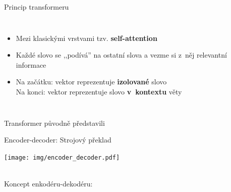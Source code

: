 \documentclass[aspectratio=169,dvipsnames]{beamer}
\begin{document}

\begin{frame}{Princip transformeru}

    \begin{columns}

        \scalebox{.8}{}

        \begin{itemize}[<+->]

            \item Mezi klasickými vrstvami tzv. \textbf{self-attention}

            \item Každé slovo se ,,podívá'' na ostatní slova a vezme si z~něj
                relevantní informace

            \item Na začátku: vektor reprezentuje \textbf{izolované} slovo \\
                Na konci: vektor reprezentuje slovo \textbf{v~kontextu} věty

        \end{itemize}

    \end{columns}

    \vspace{10pt}
    \tiny Transformer původně představili \citet{vaswani2017attention}

\end{frame}


\begin{frame}{Encoder-decoder: Strojový překlad}

    \begin{center}
    \texttt{[image: img/encoder\_decoder.pdf]}
    \end{center}

    \vspace{10pt}

    \centering
     \\
    \tiny Koncept enkodéru-dekodéru: \citep{kalchbrenner2013recurrent,sutskever2014sequence,bahdanaou2015neural}

\end{frame}
\end{document}
